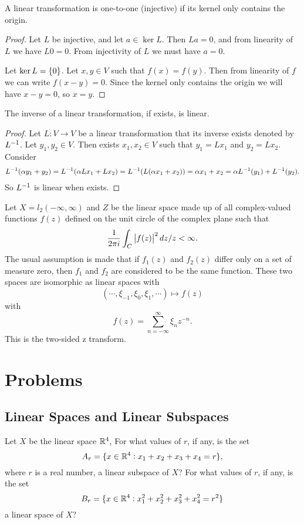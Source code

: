 \begin{summary}
	A linear transformation is one-to-one (injective) if its kernel only contains the origin.
	\begin{proof}
		Let $ L $ be injective, and let $ a\in \ker L $. Then $ La = 0 $, and from linearity of $ L $ we have $ L0 = 0 $. From injectivity of $ L $ we must have $ a =0  $.
		
		Let $ \ker L = \{0\} $. Let $ x,y\in V $ such that $ f(x) = f(y) $. Then from linearity of $ f $ we can write $ f(x-y) = 0 $. Since the kernel only contains the origin we will have $ x-y= 0 $, so $ x= y $.
	\end{proof}
\end{summary}

\begin{summary}
	The inverse of a linear transformation, if exists, is linear. 
	\begin{proof}
		Let $ L:V\to V $ be a linear transformation that its inverse exists denoted by $ L^{-1} $. Let $ y_1,y_2 \in V $. Then exists $ x_1,x_2\in V $ such that $ y_1 = Lx_1 $ and $ y_2 = Lx_2 $. Consider
		\begin{align*}
			L^{-1}(\alpha y_1 + y_2) = L^{-1}(\alpha Lx_1+ Lx_2) = L^{-1}(L(\alpha x_1+x_2)) = \alpha x_1 + x_2  = \alpha L^{-1}(y_1) + L^{-1}(y_2).
		\end{align*}
		So $ L^{-1} $ is linear when exists.
	\end{proof}
\end{summary}


\begin{summary}
	Let $ X = l_2(-\infty,\infty) $ and $ Z $ be the linear space made up of all complex-valued functions $ f(z) $ defined on the unit circle of the complex plane such that
	\[ \frac{1}{2\pi i} \int_C \left|f(z)\right|^2 dz/z <\infty. \]
	The usual assumption is made that if $ f_1(z) $ and $ f_2(z) $ differ only on a set of measure zero, then $ f_1 $ and $ f_2 $ are considered to be the same function. These two spaces are isomorphic as linear spaces with
	\[ (\cdots,\xi_{-1},\xi_0, \xi_1,\cdots) \mapsto f(z) \]
	with
	\[ f(z) = \sum_{n=-\infty}^{\infty}\xi_n z^{-n}. \]
	This is the two-sided z transform.
 \end{summary}


\section{Problems}

\subsection{Linear Spaces and Linear Subspaces}
\begin{problem}
	Let $ X $ be the linear space $ \mathbb{R}^4 $, For what values of $ r $, if any, is the set
	\[ A_r = \{x\in\mathbb{R}^4: x_1+x_2+x_3+x_4 = r\}, \]
	where $ r $ is a real number, a linear subspace of $ X $? For what values of $ r $, if any,
	is the set
	\[ B_r = \{x\in \mathbb{R}^4: x_1^2 + x_2^2 + x_3^2+x_4^2 = r^2\} \]
	a linear space of $ X $?
\end{problem}

